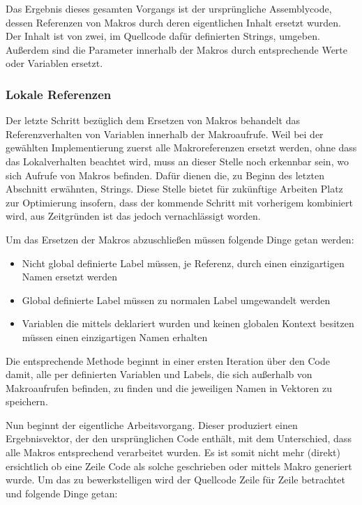 Das Ergebnis dieses gesamten Vorgangs ist der ursprüngliche Assemblycode, dessen Referenzen von Makros durch deren eigentlichen Inhalt ersetzt wurden. Der Inhalt ist von zwei, im Quellcode dafür definierten Strings, umgeben. Außerdem sind die Parameter innerhalb der Makros durch entsprechende Werte oder Variablen ersetzt.

\subsubsection{Lokale Referenzen}\label{chap:local-refs}

Der letzte Schritt bezüglich dem Ersetzen von Makros behandelt das Referenzverhalten von Variablen innerhalb der Makroaufrufe. Weil bei der gewählten Implementierung zuerst alle Makroreferenzen ersetzt werden, ohne dass das Lokalverhalten beachtet wird, muss an dieser Stelle noch erkennbar sein, wo sich Aufrufe von Makros befinden. Dafür dienen die, zu Beginn des letzten Abschnitt erwähnten, Strings. Diese Stelle bietet für zukünftige Arbeiten Platz zur Optimierung insofern, dass der kommende Schritt mit vorherigem kombiniert wird, aus Zeitgründen ist das jedoch vernachlässigt worden.

Um das Ersetzen der Makros abzuschließen müssen folgende Dinge getan werden: 

\begin{itemize}
	\item Nicht global definierte Label müssen, je Referenz, durch einen einzigartigen Namen ersetzt werden
	\item Global definierte Label müssen zu \glqq normalen\grqq{} Label umgewandelt werden
	\item Variablen die mittels  deklariert wurden und keinen globalen Kontext besitzen müssen einen einzigartigen Namen erhalten
\end{itemize}

Die entsprechende Methode beginnt in einer ersten Iteration über den Code damit, alle per  definierten Variablen und Labels, die sich außerhalb von Makroaufrufen befinden, zu finden und die jeweiligen Namen in Vektoren zu speichern.

Nun beginnt der eigentliche Arbeitsvorgang. Dieser produziert einen Ergebnisvektor, der den ursprünglichen Code enthält, mit dem Unterschied, dass alle Makros entsprechend verarbeitet wurden. Es ist somit nicht mehr (direkt) ersichtlich ob eine Zeile Code als solche geschrieben oder mittels Makro generiert wurde. Um das zu bewerkstelligen wird der Quellcode Zeile für Zeile betrachtet und folgende Dinge getan:

